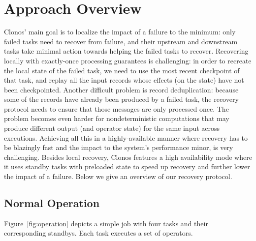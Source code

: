 \documentclass[sigconf]{acmart}
\begin{document}
\section{Approach Overview}
\label{sec:overview}
Clonos' main goal is to localize the impact of a failure to the minimum: only failed tasks need to recover from failure, and their upstream and downstream tasks take minimal action towards helping the failed tasks to recover.  %
Recovering locally with exactly-once processing guarantees is challenging: in order to recreate the local state of the failed task, we need to use the most recent checkpoint of that task, and replay all the input records whose effects (on the state) have not been checkpointed. 
Another difficult problem is record deduplication: because some of the records have already been produced by a failed task, the recovery protocol needs to ensure that those messages are only processed once.
The problem becomes even harder for nondeterministic computations that may produce different output (and operator state) for the same input across executions. Achieving all this in a highly-available manner where recovery has to be blazingly fast and the impact to the system's performance minor, is very challenging.
Besides local recovery, Clonos features a high availability mode where it uses standby tasks with preloaded state to speed up recovery and further lower the impact of a failure.
Below we give an overview of our recovery protocol.

\subsection{Normal Operation}
\label{sub:protocol-actions-op}

Figure~\ref{fig:operation} depicts a simple job with four tasks and their corresponding standbys. Each task executes a set of operators.
\end{document}

